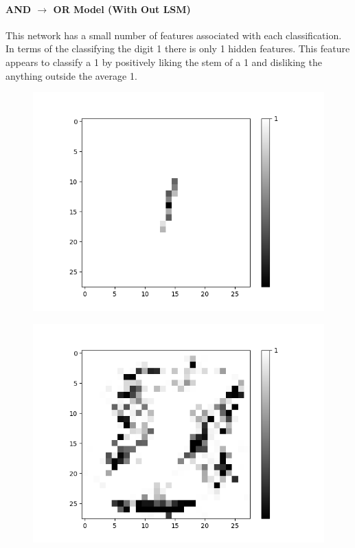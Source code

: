 \paragraph{AND $\rightarrow$ OR Model (With Out LSM)}
This network has a small number of features associated with each classification. In terms of the classifying the digit 1 there is only 1 hidden features. This feature appears to classify a 1 by positively liking the stem of a 1 and disliking the anything outside the average 1.
\begin{figure}[H]
	\captionsetup{labelformat=empty}
	\centering
	\begin{minipage}[b]{0.19\textwidth}
		\includegraphics[width=\textwidth]{AND-OR(WO-LSM)(1)/Like/True/Layer0-Neuron-3.png}
		\label{}
	\end{minipage}
	
	\medskip

	\begin{minipage}[b]{0.19\textwidth}
		\includegraphics[width=\textwidth]{AND-OR(WO-LSM)(1)/Like/False/Layer0-Neuron-3.png}
		\label{}
	\end{minipage}
	\hfill
\end{figure}

